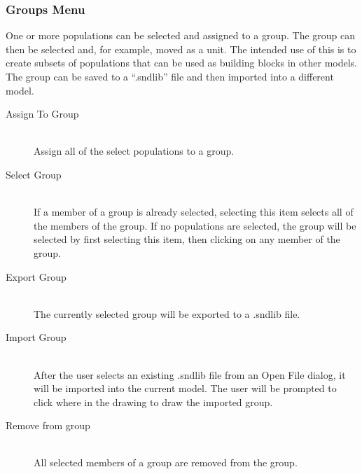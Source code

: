 \documentclass[12pt,openany,oneside]{book}
\newcommand{\ext}[1]{{{``.#1''}}}
\begin{document}
\subsubsection{Groups Menu}

One or more populations can be selected and assigned 
to a group. The group can then be selected and, for example, moved as 
a unit. The intended use of this is to create subsets of populations that
can be used as building blocks in other models. The group can be saved 
to a \ext{sndlib} file and then imported into a different model.
\begin{description}
   \item [Assign To Group] \hfill \\ 
      Assign all of the select populations to a group.
   \item [Select Group] \hfill \\ 
      If a member of a group is already selected, selecting 
      this item selects all of the members of the group. If no 
      populations are selected, the group will be selected by 
      first selecting this item, then clicking on any member of the group.
   \item [Export Group] \hfill \\ 
      The currently selected group will be exported to a .sndlib file.
   \item [Import Group] \hfill \\ 
      After the user selects an existing .sndlib file from an Open File 
      dialog, it will 
      be imported into the current model. The user will be prompted
      to click where in the drawing to draw the imported group.
   \item [Remove from group] \hfill \\ 
      All selected members of a group are removed from the group.
\end{description}
\end{document}
